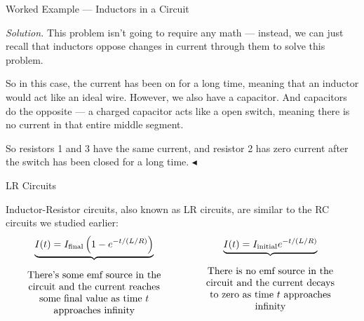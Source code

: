 \documentclass{beamer}
\begin{document}
\begin{frame}{Worked Example --- Inductors in a Circuit}

\textit{Solution.} This problem isn't going to require any math --- instead, we can just recall that inductors oppose changes in current through them to solve this problem.

\vfill

So in this case, the current has been on for a long time, meaning that an inductor would act like an ideal wire. However, we also have a capacitor. And capacitors do the opposite --- a charged capacitor acts like a open switch, meaning there is no current in that entire middle segment.

\vfill

So resistors 1 and 3 have the same current, and resistor 2 has zero current after the switch has been closed for a long time. $\blacktriangleleft$

\end{frame}

\begin{frame}{LR Circuits}

Inductor-Resistor circuits, also known as LR circuits, are similar to the RC circuits we studied earlier:
\begin{equation*}
    \underbrace{I(t) = I_{\text{final}} \left( 1 - e^{-t/(L/R)} \right)}_{\parbox[c]{0.4\textwidth}{\begin{center} There's some emf source in the circuit and the current reaches some final value as time $t$ approaches infinity \end{center}}} \qquad\qquad \underbrace{I(t) = I_{\text{initial}} e^{-t/(L/R)}}_{\parbox[c]{0.4\textwidth}{\begin{center} There is no emf source in the circuit and the current decays to zero as time $t$ approaches infinity \end{center}}}
\end{equation*}

\end{frame}
\end{document}
